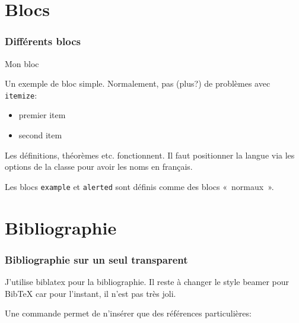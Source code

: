 \documentclass[fr,biblatex,outline]{isae-slides}
\begin{document}
\section{Blocs}
\label{sec:blocs}

\begin{frame}
\frametitle{Différents blocs}

\vfill

\begin{block}{Mon bloc}

Un exemple de bloc simple. Normalement, pas (plus?) de problèmes avec
\texttt{itemize}:

\begin{itemize}
\item premier item
\item second item
\end{itemize}  
\end{block}

\vfill

\begin{definition}[Ma définition]
Les définitions, théorèmes etc. fonctionnent. Il faut positionner la
langue via les options de la classe pour avoir les noms en français.
\end{definition}

\vfill

\begin{example}
Les blocs \texttt{example} et \texttt{alerted} sont définis comme des
blocs «~normaux~».
\end{example}

\vfill

\end{frame}

\section{Bibliographie}
\label{sec:biblio}

\begin{frame}
\frametitle{Bibliographie sur un seul transparent}

J'utilise biblatex pour la bibliographie. Il reste à changer le style
beamer pour BibTeX car pour l'instant, il n'est pas très joli.

Une commande permet de n'insérer que des références particulières:

\vspace{1cm}


\end{frame}
\end{document}
